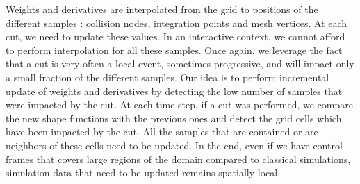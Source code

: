 Weights and derivatives are interpolated from the grid to positions of the different samples : collision nodes, integration points and mesh vertices. At each cut, we need to update these values. In an interactive context, we cannot afford to perform interpolation for all these samples. Once again, we leverage the fact that a cut is very often a local event, sometimes progressive, and will impact only a small fraction of the different samples. Our idea is to perform incremental update of weights and derivatives by detecting the low number of samples that were impacted by the cut. At each time step, if a cut was performed, we compare the new shape functions with the previous ones and detect the grid cells which have been impacted by the cut. All the samples that are contained or are neighbors of these cells need to be updated. In the end, even if we have control frames that covers large regions of the domain compared to classical simulations, simulation data that need to be updated remains spatially local.
